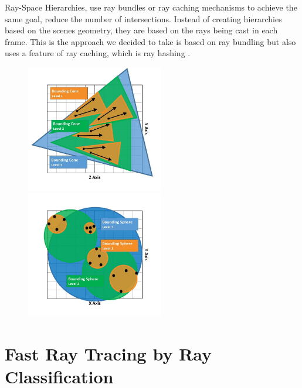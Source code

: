 Ray-Space Hierarchies, use ray bundles or ray caching mechanisms to achieve the same goal, reduce the number of intersections. Instead of creating hierarchies based on the scenes geometry, they are based on the rays being cast in each frame. This is the approach we decided to take is based on ray bundling but also uses a feature of ray caching, which is ray hashing \cite{Arvo87} \cite{Aila10}.

\begin{figure}[!htb]
    \begin{minipage}{0.475\linewidth}
        \centering
        \includegraphics[width=6.0cm]{Images/Bounding_Cone}
    \end{minipage}
    \begin{minipage}{0.475\linewidth}
        \centering
        \includegraphics[width=6.0cm]{Images/Bounding_Sphere}
    \end{minipage}
\end{figure}

\pagebreak

\section{Fast Ray Tracing by Ray Classification}
\label{section:backgroud_arvo97}

